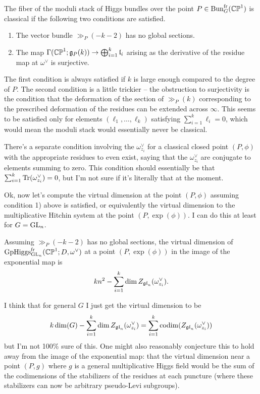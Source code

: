 \documentclass[10pt, oneside]{article}
\begin{document}
\begin{prop}
The fiber of the moduli stack of Higgs bundles over the point $P \in \operatorname{Bun}_G^{\mathrm{fr}}(\mathbb{CP}^1)$ is classical if the following two conditions are satisfied.
\begin{enumerate} 
 \item The vector bundle $\gg_P(-k-2)$ has no global sections.
 \item The map $\Gamma(\mathbb{CP}^1; \mathfrak{g}_P(k)) \to \bigoplus_{i=1}^k \mathfrak{l}_i$ arising as the derivative of the residue map at $\omega^\vee$ is surjective.
\end{enumerate}
\end{prop}

The first condition is always satisfied if $k$ is large enough compared to the degree of $P$.  The second condition is a little trickier -- the obstruction to surjectivity is the condition that the deformation of the section of $\gg_P(k)$ corresponding to the prescribed deformation of the residues can be extended across $\infty$.  This seems to be satisfied only for elements $(\ell_1, \ldots, \ell_k)$ satisfying $\sum_{i=1}^k \ell_i = 0$, which would mean the moduli stack would essentially never be classical.

\begin{remark}
There's a separate condition involving the $\omega^\vee_{z_i}$ for a classical closed point $(P,\phi)$ with the appropriate residues to even exist, saying that the $\omega^\vee_{z_i}$ are conjugate to elements summing to zero.  This condition should essentially be that $\sum_{i=1}^k \operatorname{Tr}(\omega^\vee_{z_i}) = 0$, but I'm not sure if it's literally that at the moment.
\end{remark}

Ok, now let's compute the virtual dimension at the point $(P,\phi)$ assuming condition 1) above is satisfied, or equivalently the virtual dimension to the multiplicative Hitchin system at the point $(P,\exp(\phi))$.  I can do this at least for $G = \mathrm{GL}_n$.

\begin{prop}
Assuming $\gg_P(-k-2)$ has no global sections, the virtual dimension of $\mathrm{GpHiggs}_{\mathrm{GL}_n}^{\mathrm{fr}}(\mathbb{CP}^1; D, \omega^\vee)$ at a point $(P,\exp(\phi))$ in the image of the exponential map is 
\[kn^2 - \sum_{i=1}^k \dim Z_{\mathfrak{gl}_n}(\omega^\vee_{z_i}).\]
\end{prop}

\begin{remark}
I think that for general $G$ I just get the virtual dimension to be
\[k\dim(G) - \sum_{i=1}^k \dim Z_{\mathfrak{gl}_n}(\omega^\vee_{z_i}) = \sum_{i=1}^k \operatorname{codim}(Z_{\mathfrak{gl}_n}(\omega^\vee_{z_i}))\]
but I'm not 100\% sure of this.  One might also reasonably conjecture this to hold away from the image of the exponential map: that the virtual dimension near a point $(P,g)$ where $g$ is a general multiplicative Higgs field would be the sum of the codimensions of the stabilizers of the residues at each puncture (where these stabilizers can now be arbitrary pseudo-Levi subgroups).
\end{remark}
\end{document}
